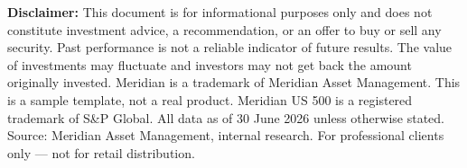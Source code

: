 \vspace{6pt}

\begin{tcolorbox}[
  colback=ice!80,
  colframe=ice!80,
  arc=2pt,
  boxrule=0pt,
  left=8pt,
  right=8pt,
  top=6pt,
  bottom=6pt,
  before skip=8pt,
  fontupper=\fontsize{7.2}{9}\selectfont\color{slate}
]
\textbf{Disclaimer:} This document is for informational purposes only and does not constitute
investment advice, a recommendation, or an offer to buy or sell any security. Past performance
is not a reliable indicator of future results. The value of investments may fluctuate and
investors may not get back the amount originally invested. Meridian\texttrademark
is a trademark of Meridian Asset Management. This is a sample template, not a real product.
Meridian US 500 is a registered trademark of S\&P Global. All data
as of 30 June 2026 unless otherwise stated. Source: Meridian Asset Management, internal research.
For professional clients only --- not for retail distribution.
\end{tcolorbox}
